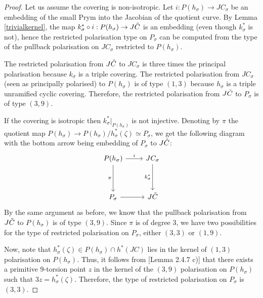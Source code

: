 \documentclass{amsart}
\theoremstyle{remark}
\numberwithin{equation}{section}
\newcommand{\ZZ}{\mathbb Z}
\newcommand{\tC}{\Tilde{C}}
\newcommand{\s}{\sigma}
\begin{document}
\begin{proof}
Let us assume the covering is non-isotropic. %
Let $i: P(h_\s)\to JC_\s$ be an embedding of the small Prym into the Jacobian of the quotient curve. By Lemma \ref{trivialkernel}, the map $k_{\s}^*\circ i: P(h_\s)\to J\tC$ is an embedding (even though $k_{\s}^*$ is not), hence the restricted polarisation type on $P_\s$ can be computed from the type of the pullback polarisation on $JC_\s$ restricted to $P(h_\s)$. %

The restricted polarisation from $J\tC$ to $JC_\s$ is three times the principal polarisation because $k_\s$ is a triple covering.
The restricted polarisation from $JC_\s$ (seen as principally polarised) to $P(h_\s)$ is of type $(1,3)$ because $h_\s$ is a triple unramified cyclic covering.
Therefore, the restricted polarisation from $J\tC$ to $P_{\s}$ is of type $(3,9)$.

If the covering is isotropic then $k_\s^*|_{P(h_\s)}$ is not injective. Denoting by $\pi$ the quotient map $P\left(h_\sigma\right) \rightarrow P\left(h_\sigma\right) / h_\sigma^*(\zeta) \simeq P_{\sigma}$, we get the following diagram with the bottom arrow being embedding of $P_\s$ to $J\tC$:
\begin{equation}
\begin{tikzcd}[row sep=huge]
P(h_\s) \arrow[r,"i"] \arrow[d,swap,"\pi"] & JC_\s \arrow[d,swap,"k_\s^*"]
\\
P_\s \arrow[r,""] & J\tC 
\end{tikzcd}
\end{equation}
By the same argument as before, we know that the pullback polarisation from $J\tC$ to $P(h_\s)$ is of type $(3,9)$. Since $\pi$ is of degree 3, we have two possibilities for the type of restricted polarisation on $P_{\s}$, either $(3,3)$ or $(1,9)$. 

Now, note that $h_\sigma^*(\zeta)\in P(h_\s)\cap h^*(JC)$ lies in the kernel of $(1,3)$ polarisation on $P(h_\s)$. Thus, it follows from \cite{BL}[Lemma 2.4.7 c)] that there exists a primitive $9$-torsion point $z$ in the kernel of the $(3,9)$ polarisation on $P(h_\s)$ such that $3z = h_\sigma^*(\zeta)$. Therefore, the type of restricted polarisation on $P_{\s}$ is $(3,3)$.


\end{proof}
\end{document}
